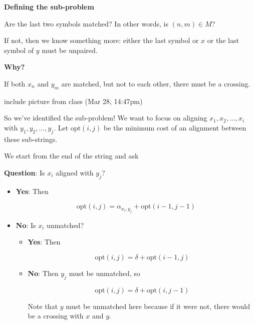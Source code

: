 \documentclass[12pt]{article}
\def\opt{\text{opt}}
\begin{document}
  {\bf Defining the sub-problem}

  Are the last two symbols matched? In other words, is $(n, m) \in M$?


  If not, then we know something more: either the last symbol or $x$ or the last
  symbol of $y$ must be unpaired.

  {\bf Why?}

  If both $x_n$ and $y_m$ are matched, but not to each other, there must be a
  crossing.


  \TODO{} include picture from class (Mar 28, 14:47pm)

  So we've identified the sub-problem! We want to focus on aligning $x_1, x_2,
  \dots, x_i$ with $y_1, y_2, \dots, y_j$. Let $\opt(i, j)$ be the minimum cost
  of an alignment between these sub-strings.

  We start from the end of the string and ask

  {\bf Question}: Is $x_i$ aligned with $y_j$?

  \begin{itemize}
    \item {\bf Yes}: Then

      \[
        \opt(i, j) = \alpha_{x_i, y_j} + \opt(i - 1, j - 1)
      \]
      
    \item {\bf No}: Is $x_i$ unmatched?
      \begin{itemize}
        \item {\bf Yes}: Then

          \[
            \opt(i, j) = \delta + \opt(i - 1, j)
          \]

        \item {\bf No}: Then $y_j$ must be unmatched, so

          \[
            \opt(i, j) = \delta + \opt(i, j - 1)
          \]

          Note that $y$ must be unmatched here because if it were not, there
          would be a crossing with $x$ and $y$.
      \end{itemize}
  \end{itemize}
\end{document}
